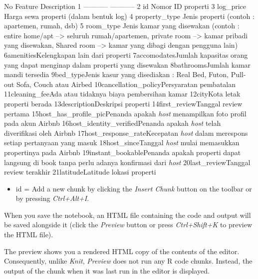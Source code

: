 \documentclass[]{article}
\providecommand{\tightlist}{%
  \setlength{\itemsep}{0pt}\setlength{\parskip}{0pt}}
\begin{document}
\textbar{}No\textbar{} Feature \textbar{} Description \textbar{}
\textbar{}1\textbar{} ----------- \textbar{} ----------- \textbar{}
\textbar{}2\textbar{} id \textbar{} Nomor ID properti \textbar{}
\textbar{}3\textbar{} log\_price \textbar{} Harga sewa properti (dalam
bentuk log) \textbar{} \textbar{}4\textbar{} property\_type \textbar{}
Jenis properti (contoh : apartemen, rumah, dsb) \textbar{}
\textbar{}5\textbar{} room\_type \textbar{} Jenis kamar yang disewakan
(contoh : entire home/apt --\textgreater{} seluruh rumah/apartemen,
private room --\textgreater{} kamar pribadi yang disewakan, Shared room
--\textgreater{} kamar yang dibagi dengan pengguna lain) \textbar{}
\textbar{}6\textbar{}amenities\textbar{}Kelengkapan lain dari
properti\textbar{} \textbar{}7\textbar{}accomodates\textbar{}Jumlah
kapasitas orang yang dapat menginap dalam properti yang
disewakan\textbar{} \textbar{}8\textbar{}bathrooms\textbar{}Jumlah kamar
mandi tersedia\textbar{} \textbar{}9\textbar{}bed\_type\textbar{}Jenis
kasur yang disediakan : Real Bed, Futon, Pull-out Sofa, Couch atau
Airbed\textbar{}
\textbar{}10\textbar{}cancellation\_policy\textbar{}Persyaratan
pembatalan\textbar{} \textbar{}11\textbar{}cleaning\_fee\textbar{}Ada
atau tidaknya biaya pembersihan kamar\textbar{}
\textbar{}12\textbar{}city\textbar{}Kota letak properti berada\textbar{}
\textbar{}13\textbar{}description\textbar{}Deskripsi properti\textbar{}
\textbar{}14\textbar{}first\_review\textbar{}Tanggal review
pertama\textbar{}
\textbar{}15\textbar{}host\_has\_profile\_pic\textbar{}Penanda apakah
\emph{host} menampilkan foto profil pada akun Airbnb\textbar{}
\textbar{}16\textbar{}host\_identity\_verified\textbar{}Penanda apakah
\emph{host} telah diverifikasi oleh Airbnb\textbar{}
\textbar{}17\textbar{}host\_response\_rate\textbar{}Kecepatan
\emph{host} dalam merespons setiap pertanyaan yang masuk\textbar{}
\textbar{}18\textbar{}host\_since\textbar{}Tanggal \emph{host} mulai
memasukkan propertinya pada Airbnb\textbar{}
\textbar{}19\textbar{}instant\_bookable\textbar{}Penanda apakah properti
dapat langsung di book tanpa perlu adanya konfirmasi dari
\emph{host}\textbar{}
\textbar{}20\textbar{}last\_review\textbar{}Tanggal review
terakhir\textbar{} \textbar{}21\textbar{}latitude\textbar{}Latitude
lokasi properti\textbar{}

\begin{itemize}
\tightlist
\item
  id = Add a new chunk by clicking the \emph{Insert Chunk} button on the
  toolbar or by pressing \emph{Ctrl+Alt+I}.
\end{itemize}

When you save the notebook, an HTML file containing the code and output
will be saved alongside it (click the \emph{Preview} button or press
\emph{Ctrl+Shift+K} to preview the HTML file).

The preview shows you a rendered HTML copy of the contents of the
editor. Consequently, unlike \emph{Knit}, \emph{Preview} does not run
any R code chunks. Instead, the output of the chunk when it was last run
in the editor is displayed.
\end{document}
